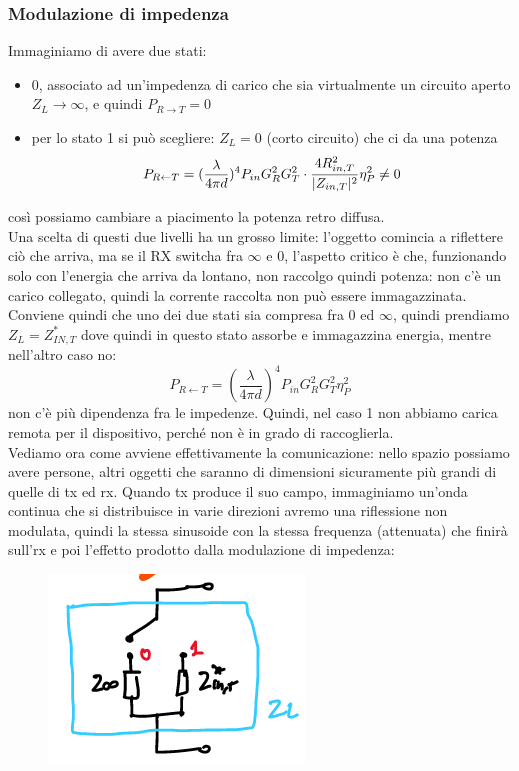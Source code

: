 \documentclass[oneside, 12pt]{extbook}
\DeclarePairedDelimiter{\abs}{\lvert}{\rvert}
\begin{document}
\subsubsection{Modulazione di impedenza}
Immaginiamo di avere due stati:
\begin{itemize}
	\item 0, associato ad un'impedenza di carico che sia virtualmente un circuito aperto $Z_L \rightarrow \infty$, e quindi $P_{R \rightarrow T} = 0$
	\item per lo stato 1 si può scegliere: $Z_L = 0$ (corto circuito) che ci da una potenza 
	\begin{equation}
		P_{R \leftarrow T} = (\frac{\lambda}{4 \pi d})^4 P_{in}G_R^2G_T^2 \cdot \dfrac{4 R_{in,T}^2}{\abs{Z_{in,T}}^2} \eta_P^2 \neq 0
	\end{equation}
\end{itemize}
così possiamo cambiare a piacimento la potenza retro diffusa.\\Una scelta di questi due livelli ha un grosso limite: l'oggetto comincia a riflettere ciò che arriva, ma se il RX switcha fra $\infty$ e 0, l'aspetto critico è che, funzionando solo con l'energia che arriva da lontano, non raccolgo quindi potenza: non c'è un carico collegato, quindi la corrente raccolta non può essere immagazzinata.\\Conviene quindi che uno dei due stati sia compresa fra $0$ ed $\infty$, quindi prendiamo $Z_L = Z_{IN,T}^*$ dove quindi in questo stato assorbe e immagazzina energia, mentre nell'altro caso no: 
\begin{equation}
	P_{R \leftarrow T} = (\frac{\lambda}{4 \pi d})^4 P_{in} G_R^2G_T^2\eta_P^2
\end{equation}
non c'è più dipendenza fra le impedenze. Quindi, nel caso 1 non abbiamo carica remota per il dispositivo, perché non è in grado di raccoglierla.\\Vediamo ora come avviene effettivamente la comunicazione: nello spazio possiamo avere persone, altri oggetti che saranno di dimensioni sicuramente più grandi di quelle di tx ed rx. Quando tx produce il suo campo, immaginiamo un'onda continua che si distribuisce in varie direzioni avremo una riflessione non modulata, quindi la stessa sinusoide con la stessa frequenza (attenuata) che finirà sull'rx e poi l'effetto prodotto dalla modulazione di impedenza:\\ 
\begin{figure}[!h]
	\includegraphics[scale=0.3]{immagini/mod_transp_01.png}
\end{figure}
\end{document}

